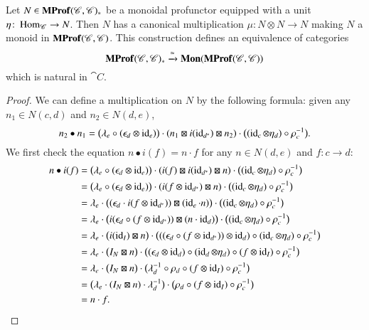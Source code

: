 \documentclass[12pt,oneside,article,draft]{memoir}
\begin{document}
\begin{proposition}\label{Prop:unit implies monoid}
	Let $N\in\mathbf{MProf}(\mathscr{C},\mathscr{C})_*$ be a monoidal profunctor equipped with a unit $\eta\colon\operatorname{Hom}_{\mathscr{C}}\to N$.
	Then $N$ has a canonical multiplication $\mu\colon N\otimes N\to N$ making $N$ a monoid in $\mathbf{MProf}(\mathscr{C},\mathscr{C})$.
	This construction defines an equivalence of categories
		\[\mathbf{MProf}(\mathscr{C},\mathscr{C})_*\xrightarrow{\simeq}\mathbf{Mon}(\mathbf{MProf}(\mathscr{C},\mathscr{C}))\]
	which is natural in $\cat{C}$.
\end{proposition}
\begin{proof}
	We can define a multiplication on $N$ by the following formula: given any $n_1\in N(c,d)$ and $n_2\in N(d,e)$,
	\[
		n_2\bullet n_1 = \bigl(\lambda_e\circ(\epsilon_d\otimes\operatorname{id}_e)\bigr)\cdot(n_1\boxtimes i(\operatorname{id}_{d^*})\boxtimes n_2)\cdot\bigl((\operatorname{id}_c\otimes \eta_d)\circ\rho_c^{-1}\bigr).
	\]
	We first check the equation $n\bullet i(f)=n\cdot f$ for any $n\in N(d,e)$ and $f\colon c\to d$:
	\begin{align*}
		n\bullet i(f) &= \bigl(\lambda_e\circ(\epsilon_d\otimes\operatorname{id}_e)\bigr)\cdot(i(f)\boxtimes i(\operatorname{id}_{d^*})\boxtimes n)\cdot\bigl((\operatorname{id}_c\otimes \eta_d)\circ\rho_c^{-1}\bigr) \\
		&= \bigl(\lambda_e\circ(\epsilon_d\otimes\operatorname{id}_e)\bigr)\cdot(i(f\otimes\operatorname{id}_{d^*})\boxtimes n)\cdot\bigl((\operatorname{id}_c\otimes \eta_d)\circ\rho_c^{-1}\bigr) \\
		&= \lambda_e\cdot\bigl((\epsilon_d\cdot i(f\otimes \operatorname{id}_{d^*}))\boxtimes (\operatorname{id}_e\cdot n)\bigr)\cdot\bigl((\operatorname{id}_c\otimes \eta_d)\circ\rho_c^{-1}\bigr) \\
		&= \lambda_e\cdot\bigl(i(\epsilon_d\circ (f\otimes \operatorname{id}_{d^*}))\boxtimes (n\cdot\operatorname{id}_d)\bigr)\cdot\bigl((\operatorname{id}_c\otimes \eta_d)\circ\rho_c^{-1}\bigr) \\
		&= \lambda_e\cdot\bigl(i(\operatorname{id}_I)\boxtimes n\bigr)\cdot\bigl(((\epsilon_d\circ (f\otimes \operatorname{id}_{d^*}))\otimes\operatorname{id}_d)\circ(\operatorname{id}_c\otimes \eta_d)\circ\rho_c^{-1}\bigr) \\
		&= \lambda_e\cdot\bigl(I_N\boxtimes n\bigr)\cdot\bigl((\epsilon_d\otimes\operatorname{id}_d)\circ(\operatorname{id}_d\otimes\eta_d)\circ(f\otimes\operatorname{id}_I)\circ\rho_c^{-1}\bigr) \\
		&= \lambda_e\cdot\bigl(I_N\boxtimes n\bigr)\cdot\bigl(\lambda_d^{-1}\circ\rho_d\circ(f\otimes\operatorname{id}_I)\circ\rho_c^{-1}\bigr) \\
		&= \bigl(\lambda_e\cdot(I_N\boxtimes n)\cdot\lambda_d^{-1}\bigr)\cdot\bigl(\rho_d\circ(f\otimes\operatorname{id}_I)\circ\rho_c^{-1}\bigr) \\
		&= n\cdot f.
	\end{align*}


\end{proof}
\end{document}
